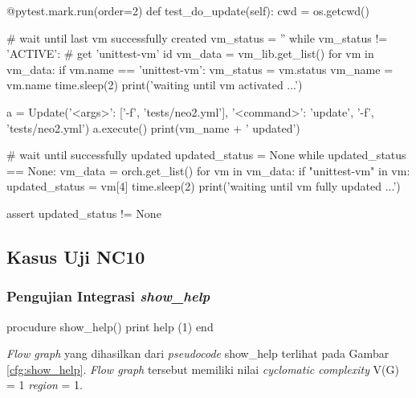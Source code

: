 \begin{code}
\begin{ignasicblock}[title=test\_do\_update,minted language=Python]
    @pytest.mark.run(order=2)
    def test_do_update(self):
        cwd = os.getcwd()

        # wait until last vm successfully created
        vm_status = ''
        while vm_status != 'ACTIVE':
            # get 'unittest-vm' id
            vm_data = vm_lib.get_list()
            for vm in vm_data:
                if vm.name == 'unittest-vm':
                    vm_status = vm.status
                    vm_name = vm.name
            time.sleep(2)
            print('waiting until vm activated ...')

        a = Update({'<args>': ['-f', 'tests/neo2.yml'],
                    '<command>': 'update'}, '-f', 'tests/neo2.yml')
        a.execute()
        print(vm_name + ' updated')

        # wait until successfully updated
        updated_status = None
        while updated_status == None:
            vm_data = orch.get_list()
            for vm in vm_data:
                if "unittest-vm" in vm:
                    updated_status = vm[4]
            time.sleep(2)
            print('waiting until vm fully updated ...')

        assert updated_status != None
\end{ignasicblock}
  \label{ts:update}
\end{code}

\subsection{Kasus Uji NC10}

\subsubsection{Pengujian Integrasi \emph{show\_help}}

\begin{code}
\begin{ignasicblock}[title=show\_help,minted language=text]
procudure show_help()
    print help       (1)
end
\end{ignasicblock}
  \label{pc:show-help}
\end{code}

\par\null\par
\noindent
\emph{Flow graph} yang dihasilkan dari \emph{pseudocode}
show\_help terlihat pada Gambar \ref{cfg:show_help}.
\emph{Flow graph} tersebut memiliki nilai \emph{cyclomatic complexity} V(G) = 1 \emph{region} = 1.

